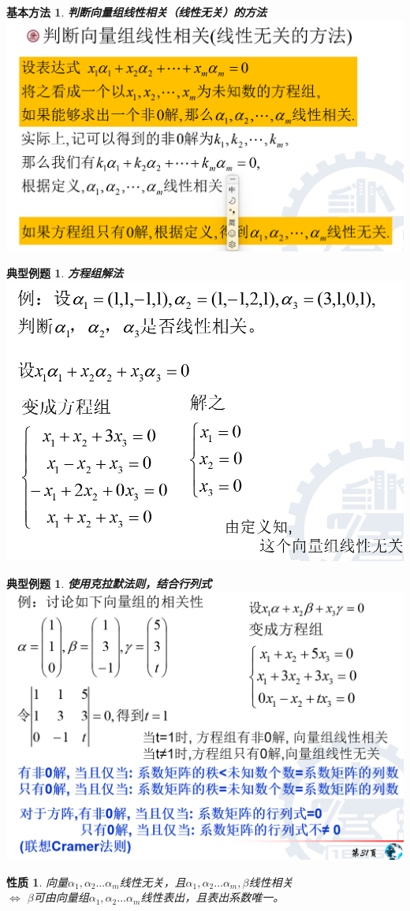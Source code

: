 \documentclass[12pt,oneside]{ctexbook}
\newtheorem{property}[subsection]{性质}
\newtheorem{method}[subsection]{基本方法}
\newtheorem{problem}[subsection]{典型例题}
\begin{document}
\begin{method}
    \textbf{判断向量组线性相关（线性无关）的方法}
    \\ \includegraphics[scale=0.4]{method3.1.png}
\end{method}
\begin{problem}
    \textbf{方程组解法}
    \\ \includegraphics[scale=0.7]{problem3.2.png}
\end{problem}
\begin{problem}
    \textbf{使用克拉默法则，结合行列式}
    \\ \includegraphics[scale=0.6]{problem3.3.png}
\end{problem}
\begin{property}
    向量\(\alpha_1,\alpha_2 \dots \alpha_m\)线性无关，且\(\alpha_1,\alpha_2 \dots \alpha_m , \beta\)线性相关
    \\ \(\Leftrightarrow\) \(\beta\)可由向量组\(\alpha_1,\alpha_2 \dots \alpha_m\)线性表出，且表出系数唯一。
\end{property}
\end{document}
